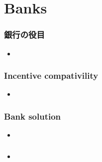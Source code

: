 \documentclass[dvipdfmx, 12pt]{beamer}
\begin{document}
\section{Banks}
\begin{frame}\frametitle{銀行の役目}
	\begin{itemize}
		\item
	\end{itemize}
\end{frame}
\begin{frame}\frametitle{Incentive compativility}
	\begin{itemize}
		\item
	\end{itemize}
\end{frame}
\begin{frame}\frametitle{Bank solution}
	\begin{itemize}
		\item
	\end{itemize}
\end{frame}
\begin{frame}\frametitle{}
	\begin{itemize}
		\item
	\end{itemize}
\end{frame}
\end{document}
